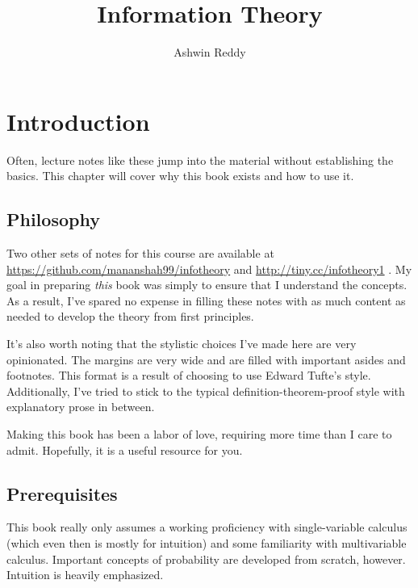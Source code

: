 \documentclass[13pt,oneside]{tufte-book}
\title{Information Theory}
\author{Ashwin Reddy}
\date{}
\theoremstyle{definition}
\theoremstyle{definition}
\theoremstyle{definition}
\theoremstyle{remark}
\begin{document}
{
}

\maketitle



{
\setcounter{tocdepth}{1}
\tableofcontents
}

\listoftables
\listoffigures

\chapter{Introduction}\label{introduction}

Often, lecture notes like these jump into the material without
establishing the basics. This chapter will cover why this book exists
and how to use it.

\section{Philosophy}\label{philosophy}

Two other sets of notes for this course are available at
\url{https://github.com/mananshah99/infotheory} and
\url{http://tiny.cc/infotheory1} . My goal in preparing \emph{this} book
was simply to ensure that I understand the concepts. As a result, I've
spared no expense in filling these notes with as much content as needed
to develop the theory from first principles.

It's also worth noting that the stylistic choices I've made here are
very opinionated. The margins are very wide and are filled with
important asides and footnotes. This format is a result of choosing to
use Edward Tufte's style. Additionally, I've tried to stick to the
typical definition-theorem-proof style with explanatory prose in
between.

Making this book has been a labor of love, requiring more time than I
care to admit. Hopefully, it is a useful resource for you.

\section{Prerequisites}\label{prerequisites}

This book really only assumes a working proficiency with single-variable
calculus (which even then is mostly for intuition) and some familiarity
with multivariable calculus. Important concepts of probability are
developed from scratch, however. Intuition is heavily emphasized.
\end{document}
